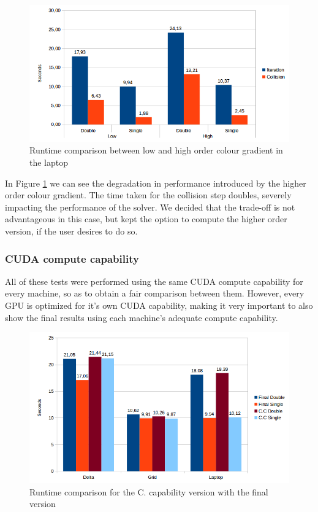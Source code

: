 \documentclass[12pt, openany]{book}
\begin{document}
  \begin{figure}[H]
  	\centering
  	\includegraphics[width=\linewidth]{Resources/Images/highlap.png}
  	\caption{Runtime comparison between low and high order colour gradient in the laptop}
  	\label{fig:highLap}
  \end{figure}
  
  In Figure \ref{fig:highLap} we can see the degradation in performance introduced by the higher order colour gradient. The time taken for the collision step doubles, severely impacting the performance of the solver. We decided that the trade-off is not advantageous in this case, but kept the option to compute the higher order version, if the user desires to do so. 

\subsubsection{CUDA compute capability}

All of these tests were performed using the same CUDA compute capability for every machine, so as to obtain a fair comparison between them. However, every GPU is optimized for it's own CUDA capability, making it very important to also show the final results using each machine's adequate compute capability.

  \begin{figure}[H]
  	\centering
  	\includegraphics[width=\linewidth]{Resources/Images/cc.png}
  	\caption{Runtime comparison for the C. capability version with the final version}
  	\label{fig:cc}
  \end{figure}
  
\end{document}
